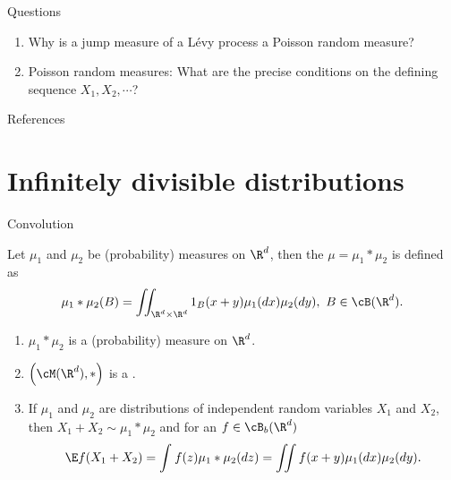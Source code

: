

\begin{frame}
    {Questions}
    
    \begin{enumerate}
        \item Why is a jump measure of a L\'evy process a Poisson random measure?
        \item Poisson random measures: What are the precise conditions on the
            defining sequence $X_1, X_2, \cdots$?
    \end{enumerate}
\end{frame}

\begin{frame}
    {References}
    
    \nocite{applebaum2009}
    \nocite{cont2004financial}
    \nocite{sato1999}

\end{frame}

\section{Infinitely divisible distributions}

\begin{frame}
    {Convolution}
    
    \begin{definition}
        Let $\mu_1$ and $\mu_2$ be (probability) measures on $\R^d$, then the
         $\mu = \mu_1 * \mu_2$ is defined as 
        \begin{equation*}
            \mu_1 * \mu_2 (B) = \iint_{\R^d \times \R^d} 1_{B}(x+y) \mu_1(dx) \mu_2(dy), \  
            B \in \cB(\R^d). 
        \end{equation*}
    \end{definition}

    \begin{enumerate}
        \item $\mu_1 * \mu_2$ is a (probability) measure on $\R^d$. 
        \item $\left( \cM(\R^d),* \right)$ is a .
        \item If $\mu_1$ and $\mu_2$ are distributions of independent random
            variables $X_1$ and $X_2$, then $X_1+X_2 \sim \mu_1 * \mu_2 $ and
            for an $f\in \cB_b(\R^d)$
            \begin{equation*}
                \E f(X_1+X_2) = \int_{}^{} f(z) \mu_1 * \mu_2 (dz) = 
                \iint f(x+y) \mu_1 (dx) \mu_2 (dy).
            \end{equation*}
    \end{enumerate}
\end{frame}



